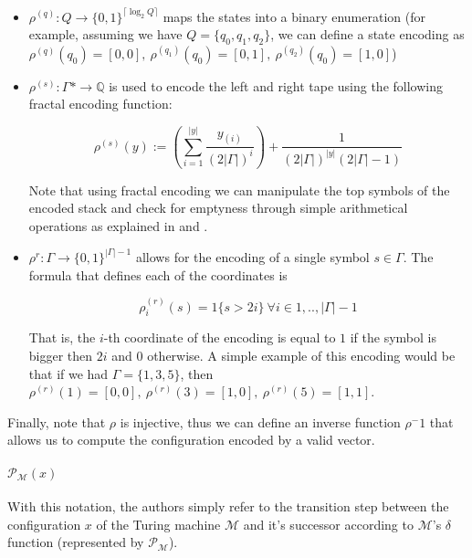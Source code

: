 \documentclass{article}
\begin{document}
\begin{itemize}
    \item $\rho^{(q)}: Q \rightarrow \{0,1\}^{\lceil \log_2 Q \rceil}$ maps the states into a binary enumeration (for example, assuming we have $Q=\{q_0,q_1,q_2\}$, we can define a state encoding as $\rho^{(q)}(q_0)=[0,0],\ \rho^{(q_1)}(q_0)=[0,1],\ \rho^{(q_2)}(q_0)=[1,0]$)
    \item $\rho^{(s)}: \Gamma* \to \mathbb{Q}$ is used to encode the left and right tape using the following fractal encoding function:

        \begin{equation}\label{eq:fractal}
            \rho^{(s)}(y) := \left(\sum_{i=1}^{|y|} \frac{y_{(i)}}{{(2|\Gamma|)^i}}\right) + \frac{1}{(2|\Gamma|)^{|y|}(2|\Gamma|-1)}
        \end{equation}

    Note that using fractal encoding we can manipulate the top symbols of the encoded stack and check for emptyness through simple arithmetical operations as explained in \cite{SIE95} and \cite{SIE995}.
    \item $\rho^{r}:\Gamma \rightarrow \{0,1\}^{|\Gamma|-1}$ allows for the encoding of a single symbol $s \in \Gamma$. The formula that defines each of the coordinates is

        \begin{equation}
            \rho^{(r)}_i(s) = 1\{s > 2i\}\ \forall i \in {1,..,|\Gamma|-1}
        \end{equation}

    That is, the $i$-th coordinate of the encoding is equal to $1$ if the symbol is bigger then $2i$ and $0$ otherwise. A simple example of this encoding would be that if we had $\Gamma=\{1,3,5\}$, then $\rho^{(r)}(1)=[0,0],\ \rho^{(r)}(3)=[1,0],\ \rho^{(r)}(5)=[1,1]$.    
\end{itemize}

Finally, note that $\rho$ is injective, thus we can define an inverse function $\rho^-1$ that allows us to compute the configuration encoded by a valid vector.

\paragraph{$\mathcal{P}_{\mathcal{M}}(x)$} With this notation, the authors simply refer to the transition step between the configuration $x$ of the Turing machine $\mathcal{M}$ and it's successor according to $\mathcal{M}$'s $\delta$ function (represented by $\mathcal{P}_{\mathcal{M}}$).
\end{document}

